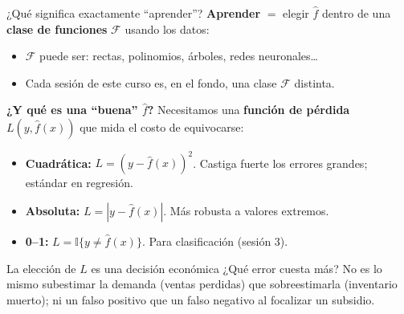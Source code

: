 \documentclass{beamer}
\newcommand{\1}{\mathbb{I}}
\begin{document}
\begin{frame}{¿Qué significa exactamente ``aprender''?}
\small
\textbf{Aprender} $=$ elegir $\hat{f}$ dentro de una \textbf{clase de funciones} $\mathcal{F}$ usando los datos:
\begin{itemize}\itemsep3pt
  \item $\mathcal{F}$ puede ser: rectas, polinomios, árboles, redes neuronales\ldots
  \item Cada sesión de este curso es, en el fondo, una clase $\mathcal{F}$ distinta.
\end{itemize}
\pause

\vspace{0.2cm}
\textbf{¿Y qué es una ``buena'' $\hat{f}$?} Necesitamos una \textbf{función de pérdida} $L(y, \hat{f}(x))$ que mida el costo de equivocarse:
\begin{itemize}\itemsep4pt
  \item \textbf{Cuadrática:} $L = (y - \hat{f}(x))^2$. Castiga fuerte los errores grandes; estándar en regresión.
  \item \textbf{Absoluta:} $L = |y - \hat{f}(x)|$. Más robusta a valores extremos.
  \item \textbf{0--1:} $L = \1\{y \neq \hat{f}(x)\}$. Para clasificación (sesión 3).
\end{itemize}
\pause

\vspace{0.2cm}
\begin{block}{La elección de $L$ es una decisión económica}
¿Qué error cuesta más? No es lo mismo subestimar la demanda (ventas perdidas) que sobreestimarla (inventario muerto); ni un falso positivo que un falso negativo al focalizar un subsidio.
\end{block}
\end{frame}
\end{document}
